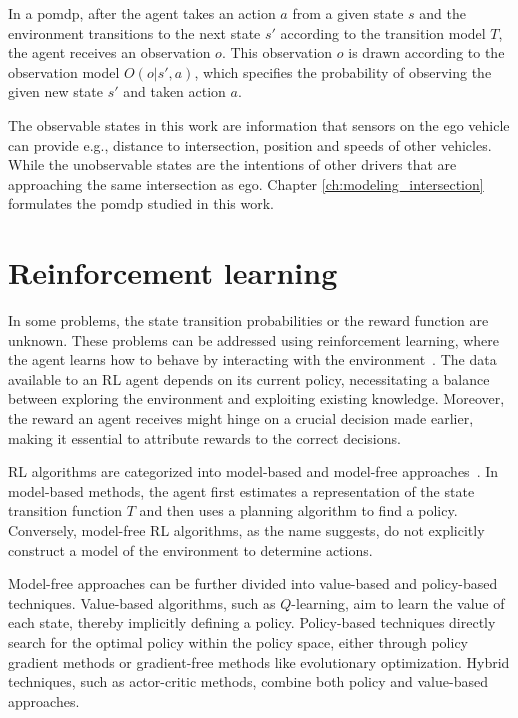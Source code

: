 In a \gls{pomdp}, after the agent takes an action $a$ from a given state $s$ and the environment transitions to the next state $s'$ according to the transition model $T$, the agent receives an observation $o$. This observation $o$ is drawn according to the observation model $O(o|s',a)$, which specifies the probability of observing the given new state $s'$ and taken action $a$.

The observable states in this work are information that sensors on the ego vehicle can provide e.g., distance to intersection, position and speeds of other vehicles. While the unobservable states are the intentions of other drivers that are approaching the same intersection as ego. Chapter \ref{ch:modeling_intersection} formulates the \gls{pomdp} studied in this work. 


\section{Reinforcement learning}
In some problems, the state transition probabilities or the reward function are unknown. These problems can be addressed using reinforcement learning, where the agent learns how to behave by interacting with the environment~\cite[Ch. 5]{Kochenderfer2015}. The data available to an RL agent depends on its current policy, necessitating a balance between exploring the environment and exploiting existing knowledge. Moreover, the reward an agent receives might hinge on a crucial decision made earlier, making it essential to attribute rewards to the correct decisions.

RL algorithms are categorized into model-based and model-free approaches~\cite[Ch. 5]{Kochenderfer2015}. In model-based methods, the agent first estimates a representation of the state transition function $T$ and then uses a planning algorithm to find a policy. Conversely, model-free RL algorithms, as the name suggests, do not explicitly construct a model of the environment to determine actions.

Model-free approaches can be further divided into value-based and policy-based techniques. Value-based algorithms, such as $Q$-learning, aim to learn the value of each state, thereby implicitly defining a policy. Policy-based techniques directly search for the optimal policy within the policy space, either through policy gradient methods or gradient-free methods like evolutionary optimization. Hybrid techniques, such as actor-critic methods, combine both policy and value-based approaches.

